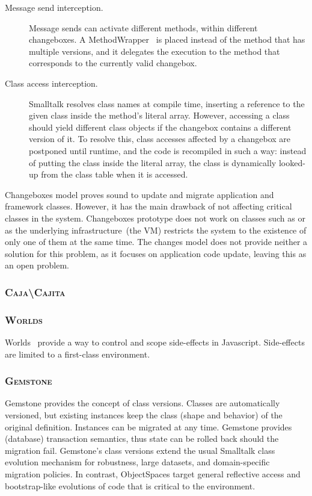 \begin{description}
\item[Message send interception.] Message sends can activate different methods, within different changeboxes. A MethodWrapper~\cite{Bran98a} is placed instead of the method that has multiple versions, and it delegates the execution to the method that corresponds to the currently valid changebox.

\item[Class access interception.] Smalltalk resolves class names at compile time, inserting a reference to the given class inside the method's literal array. However, accessing a class should yield different class objects if the changebox contains a different version of it. To resolve this, class accesses affected by a changebox are postponed until runtime, and the code is recompiled in such a way: instead of putting the class inside the literal array, the class is dynamically looked-up from the class table when it is accessed.
\end{description}

Changeboxes model proves sound to update and migrate application and framework classes. However, it has the main drawback of not affecting critical classes in the system. Changeboxes prototype does not work on classes such as  or  as the underlying infrastructure~(the VM) restricts the system to the existence of only one of them at the same time. The changes model does not provide neither a solution for this problem, as it focuses on application code update, leaving this as an open problem.

\subsubsection*{\textsc{Caja\textbackslash Cajita}}

\subsubsection*{\textsc{Worlds}}
Worlds~\cite{Wart08a} provide a way to control and scope side-effects in Javascript. Side-effects are limited to a first-class environment.

\subsubsection*{\textsc{Gemstone}}
Gemstone \cite{Otis91a} provides the concept of class versions. Classes are
automatically versioned, but existing instances keep the class (shape and
behavior) of the original definition. Instances can be migrated at any time.
Gemstone provides (database) transaction semantics, thus state can be rolled
back should the migration fail.
Gemstone's class versions extend the usual Smalltalk class evolution mechanism for robustness, 
large datasets, and domain-specific migration policies. In contrast, ObjectSpaces target general 
reflective access and bootstrap-like evolutions of code that is critical to the environment.

